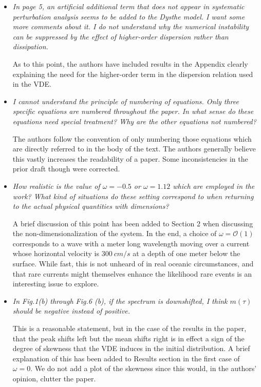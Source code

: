 \documentclass[a4paper,11pt]{article}
\begin{document}
\begin{itemize}
\item {\it In page 5, an artificial additional term that does not appear in systematic perturbation analysis seems to be  added to the Dysthe model.
I want some more comments about it.
I do not understand why the numerical instability can be suppressed by the effect of higher-order dispersion rather than dissipation.}

As to this point, the authors have included results in the Appendix clearly explaining the need for the higher-order term in the dispersion relation used in the VDE.  

\item {\it I cannot understand the principle of numbering of equations.
Only three specific equations are numbered throughout the paper. In what sense do these equations need special treatment?
Why are the other equations not numbered?}

The authors follow the convention of only numbering those equations which are directly referred to in the body of the text.  The authors generally believe this vastly increases the readability of a paper.  Some inconsistencies in the prior draft though were corrected.  

\item {\it How realistic is the value of $\omega=-0.5$ or $\omega=1.12$ which are employed in the work?
What kind of situations do these setting correspond to when returning to the actual physical quantities with dimensions?}

A brief discussion of this point has been added to Section 2 when discussing the non-dimensionalization of the system.  In the end, a choice of $\omega = \mathcal{O}(1)$ corresponds to a wave with a meter long wavelength moving over a current whose horizontal velocity is $300 ~cm/s$ at a depth of one meter below the surface.  While fast, this is not unheard of in real oceanic circumstances, and that rare currents might themselves enhance the likelihood rare events is an interesting issue to explore.    

\item {\it In Fig.1(b) through Fig.6 (b), if the spectrum is downshifted, I think $m(\tau)$ should be negative instead of positive.}

This is a reasonable statement, but in the case of the results in the paper, that the peak shifts left but the mean shifts right is in effect a sign of the degree of skewness that the VDE induces in the initial distribution.  A brief explanation of this has been added to Results section in the first case of $\omega=0$.  We do not add a plot of the skewness since this would, in the authors' opinion, clutter the paper.  


\end{itemize}
\end{document}
